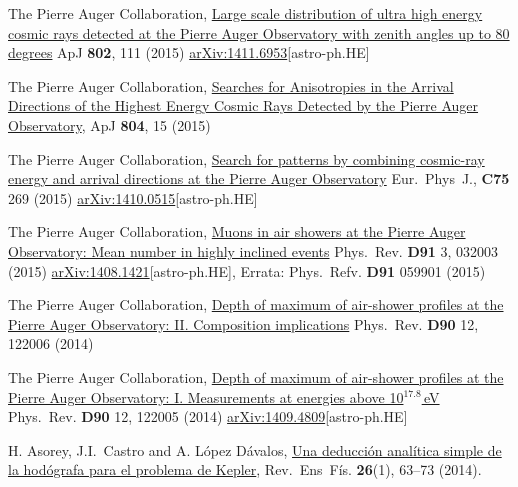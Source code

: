 \begin{etaremune}
\item {}The Pierre Auger Collaboration, \href{http://dx.doi.org/}{{Large scale distribution of ultra high energy cosmic rays detected at the Pierre Auger Observatory with zenith angles up to 80 degrees}} ApJ {\textbf{802}}, 111 (2015) \href{http://arxiv.org/abs/1411.6953}{arXiv:1411.6953}[astro-ph.HE]

\item {}The Pierre Auger Collaboration, \href{http://dx.doi.org/}{{Searches for Anisotropies in the Arrival Directions of the Highest Energy Cosmic Rays Detected by the Pierre Auger Observatory}}, ApJ {\textbf{804}}, 15 (2015) %

\item {}The Pierre Auger Collaboration, \href{http://dx.doi.org/}{{Search for patterns by combining cosmic-ray energy and arrival directions at the Pierre Auger Observatory}} Eur.\ Phys\  J., {\textbf{C75}} 269 (2015) \href{http://arxiv.org/abs/1410.0515}{arXiv:1410.0515}[astro-ph.HE]

\item {}The Pierre Auger Collaboration, \href{http://dx.doi.org/10.1103/PhysRevD.91.032003}{{Muons in air showers at the Pierre Auger Observatory: Mean number in highly inclined events}} Phys.\ Rev. {\textbf{D91}} 3, 032003 (2015) \href{http://arxiv.org/abs/1408.1421}{arXiv:1408.1421}[astro-ph.HE], Errata: Phys.\ Refv. {\textbf{D91}} 059901 (2015)

\item {}The Pierre Auger Collaboration, \href{http://dx.doi.org/10.1103/PhysRevD.90.122006}{{Depth of maximum of air-shower profiles at the Pierre Auger Observatory: II. Composition implications}} Phys.\ Rev. {\textbf{D90}} 12, 122006 (2014) %

\item {}The Pierre Auger Collaboration, \href{http://dx.doi.org/10.1103/PhysRevD.90.122005}{{Depth of maximum of air-shower profiles at the Pierre Auger Observatory: I. Measurements at energies above 10$^{17.8}$\,eV}} Phys.\ Rev. {\textbf{D90}} 12, 122005 (2014) \href{http://arxiv.org/abs/1409.4809}{arXiv:1409.4809}[astro-ph.HE]

\item {}H. Asorey, J.I.\ Castro and A. López Dávalos, \href{http://www.revistas.unc.edu.ar/index.php/revistaEF/article/view/9512}{{Una deducción analítica simple de la hodógrafa para el problema de Kepler}}, Rev.\ Ens\  Fís. {\textbf{26}}(1), 63--73 (2014).


\end{etaremune}
